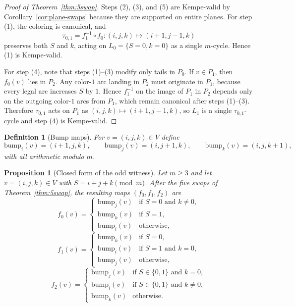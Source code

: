 \documentclass[11pt]{article}
\newtheorem{proposition}{Proposition}
\newtheorem{definition}{Definition}
\begin{document}
\begin{proof}[Proof of Theorem~\ref{thm:5swap}]
Steps (2), (3), and (5) are Kempe-valid by Corollary~\ref{cor:plane-swaps} because they are supported on entire planes.
For step (1), the coloring is canonical, and
\[
\tau_{0,1}=f_1^{-1}\circ f_0:(i,j,k)\mapsto(i+1,j-1,k)
\]
preserves both $S$ and $k$, acting on $L_0=\{S=0,k=0\}$ as a single $m$-cycle.
Hence (1) is Kempe-valid.

For step (4), note that steps (1)--(3) modify only tails in $P_0$.
If $v\in P_1$, then $f_0(v)$ lies in $P_2$.
Any color-$1$ arc landing in $P_2$ must originate in $P_1$, because every legal arc increases $S$ by $1$.
Hence $f_1^{-1}$ on the image of $P_1$ in $P_2$ depends only on the outgoing color-$1$ arcs from $P_1$, which remain canonical after steps (1)--(3).
Therefore $\tau_{0,1}$ acts on $P_1$ as $(i,j,k)\mapsto(i+1,j-1,k)$, so $L_1$ is a single $\tau_{0,1}$-cycle and step (4) is Kempe-valid.
\end{proof}

\begin{definition}[Bump maps]
For $v=(i,j,k)\in V$ define
\[
\mathrm{bump}_i(v)=(i+1,j,k),\qquad
\mathrm{bump}_j(v)=(i,j+1,k),\qquad
\mathrm{bump}_k(v)=(i,j,k+1),
\]
with all arithmetic modulo $m$.
\end{definition}

\begin{proposition}[Closed form of the odd witness]\label{prop:odd-closed}
Let $m\ge 3$ and let $v=(i,j,k)\in V$ with $S=i+j+k\pmod m$.
After the five swaps of Theorem~\ref{thm:5swap}, the resulting maps $(f_0,f_1,f_2)$ are
\[
f_0(v)=
\begin{cases}
\mathrm{bump}_j(v) & \text{if } S=0 \text{ and } k\neq 0,\\
\mathrm{bump}_k(v) & \text{if } S=1,\\
\mathrm{bump}_i(v) & \text{otherwise,}
\end{cases}
\]
\[
f_1(v)=
\begin{cases}
\mathrm{bump}_k(v) & \text{if } S=0,\\
\mathrm{bump}_i(v) & \text{if } S=1 \text{ and } k=0,\\
\mathrm{bump}_j(v) & \text{otherwise,}
\end{cases}
\]
\[
f_2(v)=
\begin{cases}
\mathrm{bump}_j(v) & \text{if } S\in\{0,1\} \text{ and } k=0,\\
\mathrm{bump}_i(v) & \text{if } S\in\{0,1\} \text{ and } k\neq 0,\\
\mathrm{bump}_k(v) & \text{otherwise.}
\end{cases}
\]
\end{proposition}
\end{document}
